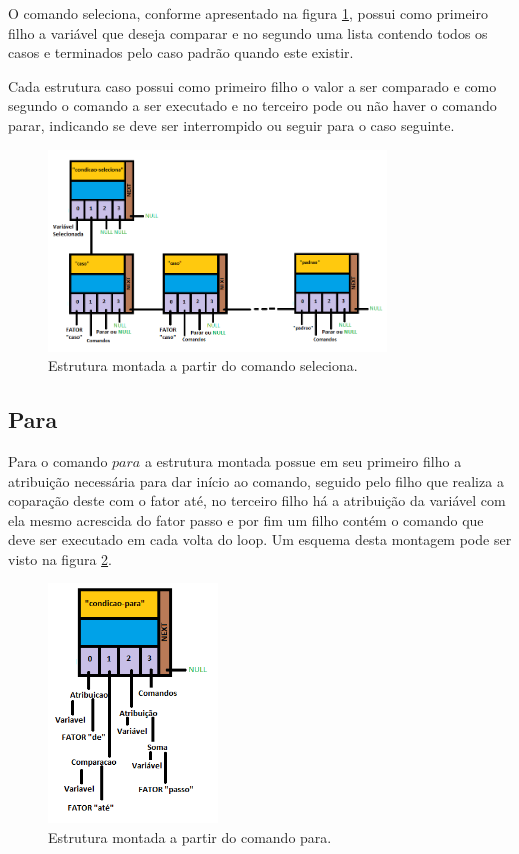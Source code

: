 \documentclass[a4paper,12pt]{report}
\begin{document}
O comando seleciona, conforme apresentado na figura \ref{fig:seleciona}, possui como primeiro filho a vari\'avel que deseja comparar e no segundo uma lista contendo todos os casos e terminados pelo caso padr\~ao quando este existir.

Cada estrutura caso possui como primeiro filho o valor a ser comparado e como segundo o comando a ser executado e no terceiro pode ou n\~ao haver o comando parar, indicando se deve ser interrompido ou seguir para o caso seguinte.

\begin{figure}
\centering
\includegraphics[width=0.8\textwidth]{imgs/Seleciona.png}
\caption{\label{fig:seleciona}Estrutura montada a partir do comando seleciona.}
\end{figure}

\subsection{Para}

Para o comando $para$ a estrutura montada possue em seu primeiro filho a atribui\c{c}\~ao necess\'aria para dar in\'icio ao comando, seguido pelo filho que realiza a copara\c{c}\~ao deste com o fator at\'e, no terceiro filho h\'a a atribui\c{c}\~ao da vari\'avel com ela mesmo acrescida do fator passo e por fim um filho cont\'em o comando que deve ser executado em cada volta do loop. Um esquema desta montagem pode ser visto na figura \ref{fig:para}.

\begin{figure}
\centering
\includegraphics[width=0.4\textwidth]{imgs/Para.png}
\caption{\label{fig:para}Estrutura montada a partir do comando para.}
\end{figure}
\end{document}
